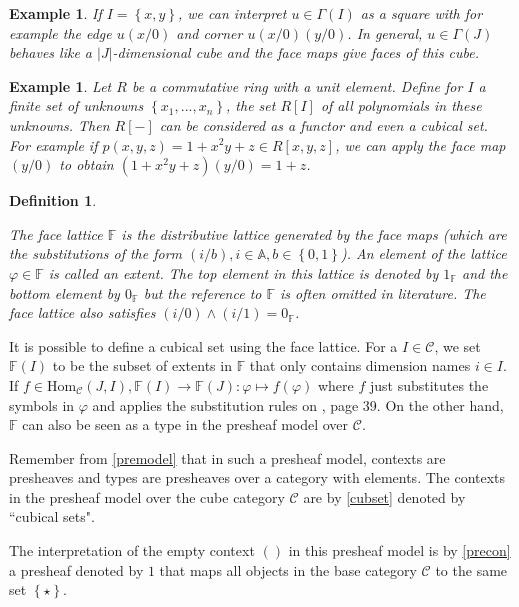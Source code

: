 \documentclass[12pt,a4paper,twoside,xetex,draft]{book}
\newcommand{\keyword}[1]{\emph{#1}\index{#1}}
\newtheorem{definition}[theorem]{Definition}
\newtheorem{example}[theorem]{Example}
\newcommand{\singleton}[0]{\left\{ \star \right\}}
\newcommand{\homo}[3]{\text{Hom}_{#1}\left(#2,#3\right)}
\begin{document}
\begin{example}
If $I = \left\{x,y \right\}$, we can interpret $u \in \Gamma(I)$ as a square with for example the edge $u(x/0)$ and corner $u(x/0)(y/0)$. In general, $u\in \Gamma (J)$ behaves like a $|J|$-dimensional cube and the face maps give faces of this cube.
\end{example}

\begin{example}
Let $R$ be a commutative ring with a unit element. Define for $I$ a finite set of unknowns $\left\{x_1 , ..., x_n \right\}$, the set $R[I]$ of all polynomials in these unknowns. Then $R[-]$ can be considered as a functor and even a cubical set. For example if $p(x,y,z) = 1 + x^2y +z \in R[x,y,z]$, we can apply the face map $(y/0)$ to obtain $(1+x^2 y +z ) (y/0) = 1+z$.
\end{example}


\begin{definition}\label{facelattice}

The \keyword{face lattice} $\mathbb{F}$ is the distributive lattice generated by the face maps (which are the substitutions of the form $(i/b), i\in \mathbb{A}, b \in \left\{ 0,1 \right\}$). An element of the lattice $\varphi \in \mathbb{F}$ is called an \keyword{extent}. The top element in this lattice is denoted by $1_{\mathbb{F}}$ and the bottom element by $0_{\mathbb{F}}$ but the reference to $\mathbb{F}$ is often omitted in literature. The face lattice also satisfies $(i/0) \wedge (i/1) = 0_{\mathbb{F}}$. 
\end{definition}


It is possible to define a cubical set using the face lattice. For a $I\in \mathcal{C}$, we set $\mathbb{F}(I)$ to be the subset of extents in $\mathbb{F}$ that only contains dimension names $i \in I$. If $f \in \homo{\mathcal{C}}{J}{I}, \mathbb{F}(I) \rightarrow \mathbb{F}(J): \varphi \mapsto f(\varphi)$ where $f$ just substitutes the symbols in $\varphi$ and applies the substitution rules on \cite{Orton2019}, page 39. On the other hand, $\mathbb{F}$ can also be seen as a type in the presheaf model over $\mathcal{C}$. 

Remember from \cref{premodel} that in such a presheaf model, contexts are presheaves and types are presheaves over a category with elements. The contexts in the presheaf model over the cube category $\mathcal{C}$ are by \cref{cubset} denoted by ``cubical sets".

The interpretation of the empty context $()$ in this presheaf model is by \cref{precon} a presheaf denoted by $1$ that maps all objects in the base category $\mathcal{C}$ to the same set $\singleton$. 
\end{document}
